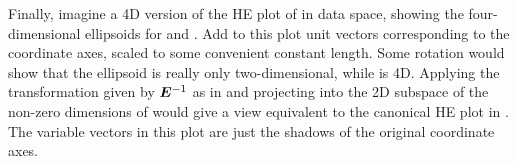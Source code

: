 Finally, imagine a 4D version of the HE plot of  in data space,
showing the four-dimensional ellipsoids for  and .  Add to this plot
unit vectors corresponding to the coordinate axes, scaled to some convenient constant length.
Some rotation would
show that the 
ellipsoid is really only two-dimensional, while  is 4D.
Applying the transformation given by $\bm{\bm{E}}^{-1}$ as in 
and projecting into the 2D subspace of the non-zero dimensions of 
would give a view equivalent to the
canonical HE plot in .
The variable vectors in this plot are just the shadows of the original coordinate axes.


